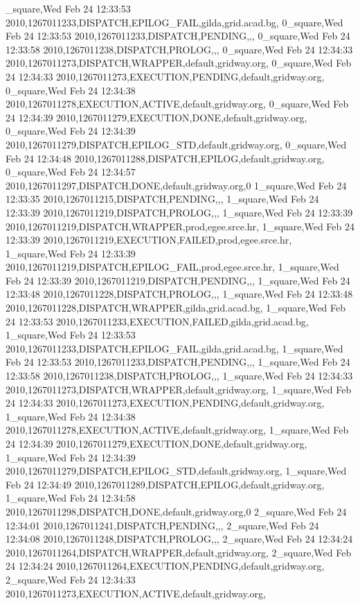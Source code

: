 \documentclass[12pt,a4paper]{article}
\newenvironment{term}{\endgraf\scriptsize\noindent\verbatim}{\endverbatim}
\begin{document}
\begin{enumerate}
\begin{term}
0_square,Wed Feb 24 12:33:53 2010,1267011233,DISPATCH,EPILOG_FAIL,gilda,grid.acad.bg,
0_square,Wed Feb 24 12:33:53 2010,1267011233,DISPATCH,PENDING,,,
0_square,Wed Feb 24 12:33:58 2010,1267011238,DISPATCH,PROLOG,,,
0_square,Wed Feb 24 12:34:33 2010,1267011273,DISPATCH,WRAPPER,default,gridway.org,
0_square,Wed Feb 24 12:34:33 2010,1267011273,EXECUTION,PENDING,default,gridway.org,
0_square,Wed Feb 24 12:34:38 2010,1267011278,EXECUTION,ACTIVE,default,gridway.org,
0_square,Wed Feb 24 12:34:39 2010,1267011279,EXECUTION,DONE,default,gridway.org,
0_square,Wed Feb 24 12:34:39 2010,1267011279,DISPATCH,EPILOG_STD,default,gridway.org,
0_square,Wed Feb 24 12:34:48 2010,1267011288,DISPATCH,EPILOG,default,gridway.org,
0_square,Wed Feb 24 12:34:57 2010,1267011297,DISPATCH,DONE,default,gridway.org,0
1_square,Wed Feb 24 12:33:35 2010,1267011215,DISPATCH,PENDING,,,
1_square,Wed Feb 24 12:33:39 2010,1267011219,DISPATCH,PROLOG,,,
1_square,Wed Feb 24 12:33:39 2010,1267011219,DISPATCH,WRAPPER,prod,egee.srce.hr,
1_square,Wed Feb 24 12:33:39 2010,1267011219,EXECUTION,FAILED,prod,egee.srce.hr,
1_square,Wed Feb 24 12:33:39 2010,1267011219,DISPATCH,EPILOG_FAIL,prod,egee.srce.hr,
1_square,Wed Feb 24 12:33:39 2010,1267011219,DISPATCH,PENDING,,,
1_square,Wed Feb 24 12:33:48 2010,1267011228,DISPATCH,PROLOG,,,
1_square,Wed Feb 24 12:33:48 2010,1267011228,DISPATCH,WRAPPER,gilda,grid.acad.bg,
1_square,Wed Feb 24 12:33:53 2010,1267011233,EXECUTION,FAILED,gilda,grid.acad.bg,
1_square,Wed Feb 24 12:33:53 2010,1267011233,DISPATCH,EPILOG_FAIL,gilda,grid.acad.bg,
1_square,Wed Feb 24 12:33:53 2010,1267011233,DISPATCH,PENDING,,,
1_square,Wed Feb 24 12:33:58 2010,1267011238,DISPATCH,PROLOG,,,
1_square,Wed Feb 24 12:34:33 2010,1267011273,DISPATCH,WRAPPER,default,gridway.org,
1_square,Wed Feb 24 12:34:33 2010,1267011273,EXECUTION,PENDING,default,gridway.org,
1_square,Wed Feb 24 12:34:38 2010,1267011278,EXECUTION,ACTIVE,default,gridway.org,
1_square,Wed Feb 24 12:34:39 2010,1267011279,EXECUTION,DONE,default,gridway.org,
1_square,Wed Feb 24 12:34:39 2010,1267011279,DISPATCH,EPILOG_STD,default,gridway.org,
1_square,Wed Feb 24 12:34:49 2010,1267011289,DISPATCH,EPILOG,default,gridway.org,
1_square,Wed Feb 24 12:34:58 2010,1267011298,DISPATCH,DONE,default,gridway.org,0
2_square,Wed Feb 24 12:34:01 2010,1267011241,DISPATCH,PENDING,,,
2_square,Wed Feb 24 12:34:08 2010,1267011248,DISPATCH,PROLOG,,,
2_square,Wed Feb 24 12:34:24 2010,1267011264,DISPATCH,WRAPPER,default,gridway.org,
2_square,Wed Feb 24 12:34:24 2010,1267011264,EXECUTION,PENDING,default,gridway.org,
2_square,Wed Feb 24 12:34:33 2010,1267011273,EXECUTION,ACTIVE,default,gridway.org,

\end{term}
\end{enumerate}
\end{document}
